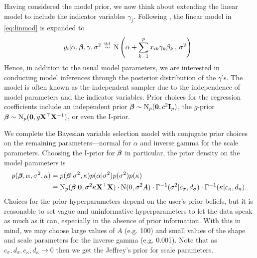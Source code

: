 \documentclass[a4paper,showframe,11pt]{report}
\begin{document}
Having considered the model prior, we now think about extending the linear model to include the indicator variables $\gamma_j$.
Following \citet{Kuo1998}, the linear model in \cref{eq:linmod} is expanded to
\begin{align}\label{eq:km}
  \begin{gathered}
    y_i|\alpha,{\bm\beta},\gamma,\sigma^2 \,\overset{\text{iid}}{\sim}\, \operatorname{N} \left( \alpha + \sum_{k=1}^p x_{ik}\gamma_k\beta_k \, , \, \sigma^2 \right).
  \end{gathered}  
\end{align} 
Hence, in addition to the usual model parameters, we are interested in conducting model inferences through the posterior distribution of the $\gamma$'s.
The \citeauthor{Kuo1998} model is often known as the independent sampler due to the independence of model parameters and the indicator variables.
Prior choices for the regression coefficients include an independent prior ${\bm\beta}\sim\operatorname{N}_p({\mathbf 0},c^2{\mathbf I}_p)$, the $g$-prior ${\bm\beta}\sim\operatorname{N}_p({\mathbf 0},g\mathbf X^\top \mathbf X^{-1})$, or even the I-prior.

We complete the Bayesian variable selection model with conjugate prior choices on the remaining parameters---normal for $\alpha$ and inverse gamma for the scale parameters.
Choosing the I-prior for ${\bm\beta}$ in particular, the prior density on the model parameters is
\begin{align}
    p({\bm\beta},\alpha,\sigma^2,\kappa) 
    &= p({\bm\beta}|\sigma^2,\kappa)p(\alpha|\sigma^2)p(\sigma^2)p(\kappa) \nonumber \\
    &\equiv \operatorname{N}_p({\bm\beta}|{\mathbf 0},\sigma^2\kappa \mathbf X^\top \mathbf X) \cdot \operatorname{N}(0,\sigma^2 A) \cdot \Gamma^{-1}(\sigma^2|c_\sigma,d_\sigma) \cdot \Gamma^{-1}(\kappa|c_\kappa,d_\kappa).
\end{align}
Choices for the prior hyperparameters depend on the user's prior beliefs, but it is reasonable to set vague and uninformative hyperparameters to let the data speak as much as it can, especially in the absence of prior information. 
With this in mind, we may choose large values of $A$ (e.g. 100) and small values of the shape and scale parameters for the inverse gamma (e.g. 0.001). 
Note that as $c_\sigma,d_\sigma,c_\kappa,d_\kappa \to 0$ then we get the Jeffrey's prior for scale parameters.
\end{document}
